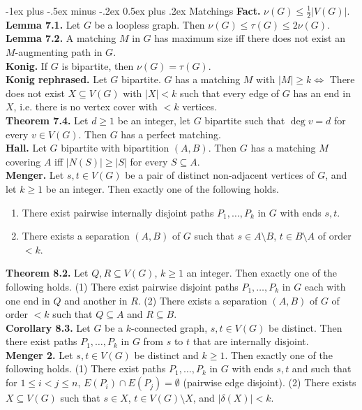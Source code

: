 \documentclass[10pt,landscape]{article}
\makeatletter
\renewcommand{\section}{\@startsection{section}{1}{0mm}%
                                {-1ex plus -.5ex minus -.2ex}%
                                {0.5ex plus .2ex}%
                                {\normalfont\large\bfseries}}
\makeatother
\begin{document}
\begin{multicols}{3}
\section{Matchings}
\textbf{Fact.} \( \nu (G) \leq \frac{1}{2} |V(G)|. \) \\
\textbf{Lemma 7.1.} Let \( G \) be a loopless graph. Then \( \nu (G) \leq \tau (G) \leq 2 \nu(G) \). \\
\textbf{Lemma 7.2.} A matching \( M \) in \( G \) has maximum size iff there does not exist an \( M \)-augmenting path in \( G \). \\
\textbf{Konig.} If \( G \) is bipartite, then \( \nu (G) = \tau (G) \). \\
\textbf{Konig rephrased.} Let \( G \) bipartite. \( G \) has a matching \( M \) with \( |M| \geq k \iff \) There does not exist \( X \subseteq V(G) \) with \( |X| < k \) such that every edge of \( G \) has an end in \( X \), i.e. there is no vertex cover with \( < k \) vertices. \\
\textbf{Theorem 7.4.} Let \( d \geq 1 \) be an integer, let \( G \) bipartite such that \( \deg v = d \) for every \( v \in  V(G) \). Then \( G \) has a perfect matching. \\
\textbf{Hall.} Let \( G \) bipartite with bipartition \( (A,B) \). Then \( G \) has a matching \( M \) covering \( A \) iff \( |N(S)| \geq |S| \) for every \( S \subseteq A \). \\
\textbf{Menger.} Let \( s,t \in V(G) \) be a pair of distinct non-adjacent vertices of \( G \), and let \( k \geq 1 \) be an integer. Then exactly one of the following holds.
\begin{enumerate}
	\item There exist pairwise internally disjoint paths \( P_1, \hdots , P_k \) in \( G \) with ends \( s,t \).
	\item There exists a separation \( (A,B) \) of \( G \) such that \( s \in A \setminus B \), \( t \in B \setminus A \) of order \( < k \).
\end{enumerate}
\textbf{Theorem 8.2.} Let \( Q, R \subseteq V(G) \), \( k \geq 1 \) an integer. Then exactly one of the following holds. (1) There exist pairwise disjoint paths \( P_1, \hdots , P_k \) in \( G \) each with one end in \( Q \) and another in \( R \). (2) There exists a separation \( (A,B) \) of \( G \) of order \( < k \) such that \( Q \subseteq A \) and \( R \subseteq B \). \\
\textbf{Corollary 8.3.} Let \( G \) be a \( k \)-connected graph, \( s,t \in V(G) \) be distinct. Then there exist paths \( P_1, \hdots , P_k \) in \( G \) from \( s \) to \( t \) that are internally disjoint. \\
\textbf{Menger 2.} Let \( s, t \in V(G) \) be distinct and \( k \geq 1 \). Then exactly one of the following holds. (1) There exist paths \( P_1, \hdots , P_k \) in \( G \) with ends \( s,t \) and such that for \( 1 \leq i < j \leq n \), \( E(P_i) \cap E(P_j) = \emptyset  \) (pairwise edge disjoint). (2) There exists \(  X \subseteq V(G) \) such that \( s \in X \), \( t \in V(G) \setminus X \), and \( |\delta (X)| < k \).

\end{multicols}
\end{document}
